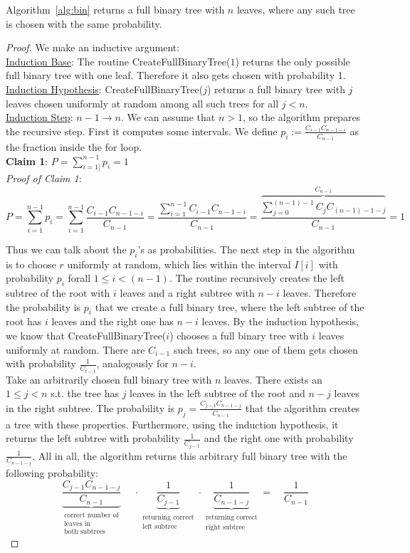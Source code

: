 \begin{lem}
Algorithm~\ref{alg:bin} returns a full binary tree with $n$ leaves, where any such tree is chosen with the same probability.
\end{lem}
\begin{proof}
We make an inductive argument:\\
\underline{Induction Base}: The routine CreateFullBinaryTree($1$) returns the only possible full binary tree with one leaf. Therefore it also gets chosen with probability 1.\\
\underline{Induction Hypothesis}: CreateFullBinaryTree($j$) returns a full binary tree with $j$ leaves chosen uniformly at random among all such trees for all $j < n$.\\
\underline{Induction Step}: $n-1 \rightarrow n$. We can assume that $n>1$, so the algorithm prepares the recursive step. First it computes some intervals. We define $p_i := \frac{C_{i-1} C_{n-1-i}}{C_{n-1}}$ as the fraction inside the for loop.\\
\textbf{Claim 1}: $P = \sum_{i=1]}^{n-1} p_i = 1$\\
\textit{Proof of Claim 1}: 
$$P = \sum_{i=1}^{n-1} p_i = \sum_{i=1}^{n-1} \frac{C_{i-1} C_{n-1-i}}{C_{n-1}} = \frac{\sum_{i=1}^{n-1} C_{i-1} C_{n-1-i}}{C_{n-1}} = \frac{\overbrace{\sum_{j=0}^{(n-1)-1} C_{j} C_{(n-1)-1-j}}^{C_{n-1}}}{C_{n-1}} = 1$$

Thus we can talk about the $p_i$'s as probabilities. The next step in the algorithm is to choose $r$ uniformly at random, which lies within the interval $I[i]$ with probability $p_i$ forall $1 \leq i < (n-1)$. The routine recursively creates the left subtree of the root with $i$ leaves and a right subtree with $n-i$ leaves. Therefore the probability is $p_i$ that we create a full binary tree, where the left subtree of the root has $i$ leaves and the right one has $n-i$ leaves. By the induction hypothesis, we know that CreateFullBinaryTree($i$) chooses a full binary tree with $i$ leaves uniformly at random. There are $C_{i-1}$ such trees, so any one of them gets chosen with probability $\frac{1}{C_{i-1}}$, analogously for $n-i$.\\
Take an arbitrarily chosen full binary tree with $n$ leaves. There exists an $1 \leq j < n$ s.t. the tree has $j$ leaves in the left subtree of the root and $n-j$ leaves in the right subtree. The probability is $p_j= \frac{C_{j-1} C_{n-1-j}}{C_{n-1}}$ that the algorithm creates a tree with these properties. Furthermore, using the induction hypothesis, it returns the left subtree with probability $\frac{1}{C_{j-1}}$ and the right one with probability $\frac{1}{C_{n-1-j}}$. All in all, the algorithm returns this arbitrary full binary tree with the following probability:
$$\underbrace{\frac{C_{j-1} C_{n-1-j}}{C_{n-1}}}_{\substack{\text{correct number of} \\ \text{leaves in}\\ \text{both subtrees}}} \quad \ \cdot \underbrace{\frac{1}{C_{j-1}}}_{\substack{\text{returning correct} \\ \text{left subtree}}} \cdot \underbrace{\frac{1}{C_{n-1-j}}}_{\substack{\text{returning correct} \\ \text{right subtree}}} = \quad \frac{1}{C_{n-1}}$$
\end{proof}
